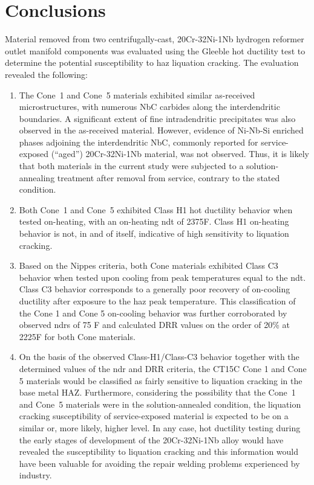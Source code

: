 \chapter{Conclusions} \label{ch:conclusions}
Material removed from two centrifugally-cast, 20Cr-32Ni-1Nb hydrogen reformer outlet manifold components was evaluated using the Gleeble hot ductility test to determine the potential susceptibility to \gls{haz} liquation cracking.  The evaluation revealed the following:

\begin{enumerate}
\item The Cone~1 and Cone~5 materials exhibited similar as-received microstructures, with numerous NbC carbides along the interdendritic boundaries. A significant extent of fine intradendritic precipitates was also observed in the as-received material. However, evidence of Ni-Nb-Si enriched phases adjoining the interdendritic NbC, commonly reported for service-exposed (“aged”) 20Cr-32Ni-1Nb material, was not observed. Thus, it is likely that both materials in the current study were subjected to a solution-annealing treatment after removal from service, contrary to the stated condition.
\item Both Cone~1 and Cone~5 exhibited Class H1 hot ductility behavior when tested on-heating, with an on-heating \gls{ndt} of 2375\textdegree{}F. Class H1 on-heating behavior is not, in and of itself, indicative of high sensitivity to liquation cracking.
\item Based on the Nippes criteria, both Cone materials exhibited Class C3 behavior when tested upon cooling from peak temperatures equal to the \gls{ndt}.  Class C3 behavior corresponds to a generally poor recovery of on-cooling ductility after exposure to the \gls{haz} peak temperature.  This classification of the Cone 1 and Cone 5 on-cooling behavior was further corroborated by observed \gls{ndr}s of 75 F\textdegree{} and calculated DRR values on the order of 20\% at 2225\textdegree{}F for both Cone materials.
\item On the basis of the observed Class-H1/Class-C3 behavior together with the determined values of the \gls{ndr} and DRR criteria, the CT15C Cone 1 and Cone 5 materials would be classified as fairly sensitive to liquation cracking in the base metal HAZ. Furthermore, considering the possibility that the Cone~1 and Cone~5 materials were in the solution-annealed condition, the liquation cracking susceptibility of service-exposed material is expected to be on a similar or, more likely, higher level. In any case, hot ductility testing during the early stages of development of the 20Cr-32Ni-1Nb alloy would have revealed the susceptibility to liquation cracking and this information would have been valuable for avoiding the repair welding problems experienced by industry.

\end{enumerate}
